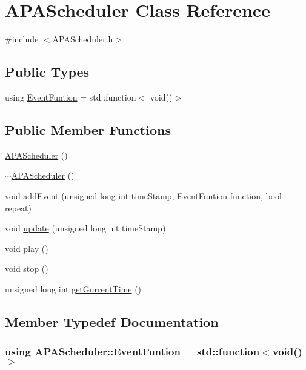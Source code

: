 \hypertarget{class_a_p_a_scheduler}{\section{A\+P\+A\+Scheduler Class Reference}
\label{class_a_p_a_scheduler}
}


{\ttfamily \#include $<$A\+P\+A\+Scheduler.\+h$>$}

\subsection*{Public Types}
\begin{DoxyCompactItemize}
\item 
using \hyperlink{class_a_p_a_scheduler_a51416792b9612857bf15bd1452f822e5}{Event\+Funtion} = std\+::function$<$ void()$>$
\end{DoxyCompactItemize}
\subsection*{Public Member Functions}
\begin{DoxyCompactItemize}
\item 
\hyperlink{class_a_p_a_scheduler_a606aca3e9180d776ecd62cc3454c5c17}{A\+P\+A\+Scheduler} ()
\item 
\hyperlink{class_a_p_a_scheduler_ad9929c81e793d38ad0d55b34af6f6ba5}{$\sim$\+A\+P\+A\+Scheduler} ()
\item 
void \hyperlink{class_a_p_a_scheduler_a0553ca2cf524a6ad833568bbdb204558}{add\+Event} (unsigned long int time\+Stamp, \hyperlink{class_a_p_a_scheduler_a51416792b9612857bf15bd1452f822e5}{Event\+Funtion} function, bool repeat)
\item 
void \hyperlink{class_a_p_a_scheduler_afe745232bb05ab60f69a05c9e72f6f5b}{update} (unsigned long int time\+Stamp)
\item 
void \hyperlink{class_a_p_a_scheduler_a56a89836651d889fd91e4b8f4a84318b}{play} ()
\item 
void \hyperlink{class_a_p_a_scheduler_a568323cec2e3bf967648815ca39c130f}{stop} ()
\item 
unsigned long int \hyperlink{class_a_p_a_scheduler_a541c53fb4eb562029cb05a18de3fe9c2}{get\+Gurrent\+Time} ()
\end{DoxyCompactItemize}


\subsection{Member Typedef Documentation}
\hypertarget{class_a_p_a_scheduler_a51416792b9612857bf15bd1452f822e5}{
\subsubsection[{Event\+Funtion}]{\setlength{\rightskip}{0pt plus 5cm}using {\bf A\+P\+A\+Scheduler\+::\+Event\+Funtion} =  std\+::function$<$void()$>$}}\label{class_a_p_a_scheduler_a51416792b9612857bf15bd1452f822e5}


